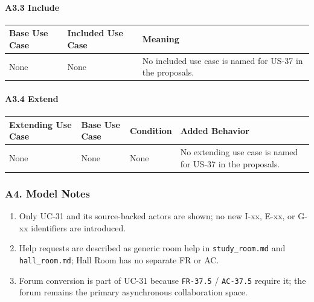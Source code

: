 \documentclass[12pt]{article}
\renewcommand{\baselinestretch}{1.5}
\begin{document}
\hypertarget{sec:a3-3-include}{}
\paragraph*{A3.3 Include}
\par\medskip

\begingroup
\small
\renewcommand{\baselinestretch}{1.0}\selectfont
\renewcommand{\arraystretch}{1.15}
\setlength{\tabcolsep}{6pt}
\begin{longtable}{|>{\raggedright\arraybackslash}p{}|>{\raggedright\arraybackslash}p{}|>{\raggedright\arraybackslash}p{}|}
\hline
\textbf{Base Use Case} & \textbf{Included Use Case} & \textbf{Meaning} \\ \hline
\endhead
None & None & No included use case is named for US-37 in the proposals. \\ \hline
\end{longtable}
\endgroup
\par\medskip

\hypertarget{sec:a3-4-extend}{}
\paragraph*{A3.4 Extend}
\par\medskip

\begingroup
\small
\renewcommand{\baselinestretch}{1.0}\selectfont
\renewcommand{\arraystretch}{1.15}
\setlength{\tabcolsep}{6pt}
\begin{longtable}{|>{\raggedright\arraybackslash}p{}|>{\raggedright\arraybackslash}p{}|>{\raggedright\arraybackslash}p{}|>{\raggedright\arraybackslash}p{}|}
\hline
\textbf{Extending Use Case} & \textbf{Base Use Case} & \textbf{Condition} & \textbf{Added Behavior} \\ \hline
\endhead
None & None & None & No extending use case is named for US-37 in the proposals. \\ \hline
\end{longtable}
\endgroup
\par\medskip

\hypertarget{sec:a4-model-notes}{}
\subsubsection*{A4. Model Notes}
\par\medskip

\begin{enumerate}
\item Only UC-31 and its source-backed actors are shown; no new I-xx, E-xx, or G-xx identifiers are introduced.
\item Help requests are described as generic room help in \texttt{study\_room.md} and \texttt{hall\_room.md}; Hall Room has no separate FR or AC.
\item Forum conversion is part of UC-31 because \texttt{FR-37.5} / \texttt{AC-37.5} require it; the forum remains the primary asynchronous collaboration space.
\end{enumerate}
\par\medskip
\end{document}
